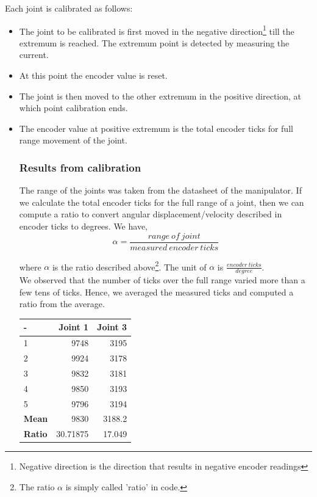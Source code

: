 \documentclass[10pt,a4paper]{article}
\begin{document}
Each joint is calibrated as follows:
\begin{itemize}
\item The joint to be calibrated is first moved in the negative
  direction\footnote{Negative direction is the direction that results
    in negative encoder readings} till the extremum is reached. The
  extremum point is detected by measuring the current.
\item At this point the encoder value is reset. 
\item The joint is then moved to the other extremum in the positive
  direction, at which point calibration ends.
\item The encoder value at positive extremum is the total encoder
  ticks for full range movement of the joint.


\subsubsection{Results from calibration}
The range of the joints was taken from the datasheet of the
manipulator. If we calculate the total encoder ticks for the full
range of a joint, then we can compute a ratio to convert angular
displacement/velocity described in encoder ticks to
degrees. We have,
\[ \alpha = \frac{range\ of\ joint}{measured\ encoder\ ticks}\]

where \(\alpha\) is the ratio described above\footnote{The ratio
  \(\alpha\) is simply called 'ratio' in code.}. The unit of
\(\alpha\) is \( \frac{encoder\ ticks}{degree}\). \\

We observed that the number of ticks over the full range varied more
than a few tens of ticks. Hence, we averaged the measured ticks and
computed a ratio from the average. \\ 

\begin{tabular}{ | l | r | r |}
\hline
- & \textbf{Joint 1} & \textbf{Joint 3} \\
\hline
1 & 9748 & 3195 \\
\hline
2 & 9924 & 3178 \\
\hline
3 & 9832 & 3181 \\
\hline
4 & 9850 & 3193 \\
\hline
5 & 9796 & 3194 \\
\hline
\textbf{Mean} & 9830 & 3188.2 \\
\hline
\textbf{Ratio} & 30.71875 & 17.049 \\
\hline


\end{tabular}
\end{itemize}
\end{document}
